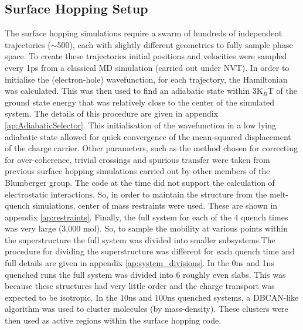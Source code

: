 \subsection{Surface Hopping Setup}
The surface hopping simulations require a swarm of hundreds of independent trajectories ($\sim$500), each with slightly different geometries to fully sample phase space. To create these trajectories initial positions and velocities were sampled every 1ps from a classical MD simulation (carried out under NVT). In order to initialise the (electron-hole) wavefunction, for each trajectory, the Hamiltonian was calculated. This was then used to find an adiabatic state within 3K$_{B}$T of the ground state energy that was relatively close to the center of the simulated system. The details of this procedure are given in appendix \ref{ap:AdiabaticSelector}. This initialisation of the wavefunction in a low lying adiabatic state allowed for quick convergence of the mean-squared displacement of the charge carrier. Other parameters, such as the method chosen for correcting for over-coherence, trivial crossings and spurious transfer were taken from previous surface hopping simulations carried out by other members of the Blumberger group. The code at the time did not support the calculation of electrostatic interactions. So, in order to maintain the structure from the melt-quench simulations, center of mass restraints were used. These are shown in appendix \ref{ap:restraints}. Finally, the full system for each of the 4 quench times was very large (3,000 mol). So, to sample the mobility at various points within the superstructure the full system was divided into smaller subsystems.The procedure for dividing the superstructure was different for each quench time and full details are given in appendix \ref{ap:system_divisions}. In the 0ns and 1ns quenched runs the full system was divided into 6 roughly even slabs. This was because these structures had very little order and the charge transport was expected to be isotropic. In the 10ns and 100ns quenched systems, a DBCAN-like algorithm \cite{DBSCAN} was used to cluster molecules (by mass-density). These clusters were then used as active regions within the surface hopping code.

